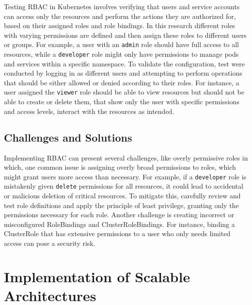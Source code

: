 Testing RBAC in Kubernetes involves verifying that users and service accounts can access only the resources and perform the actions they are authorized for, based on their assigned roles and role bindings. In this research different roles with varying permissions are defined and then assign these roles to different users or groups. For example, a user with an \texttt{admin} role should have full access to all resources, while a \texttt{developer} role might only have permissions to manage pods and services within a specific namespace. To validate the configuration, test were conducted by logging in as different users and attempting to perform operations that should be either allowed or denied according to their roles. For instance, a user assigned the \texttt{viewer} role should be able to view resources but should not be able to create or delete them, that show only the user with specific permissions and access levels, interact with the resources as intended. \cite{Kubernetes_doc}


\subsection{Challenges and Solutions}

Implementing RBAC can present several challenges, like overly permissive roles in which, one common issue is assigning overly broad permissions to roles, which might grant users more access than necessary. For example, if a \texttt{developer} role is mistakenly given \texttt{delete} permissions for all resources, it could lead to accidental or malicious deletion of critical resources. To mitigate this, carefully review and test role definitions and apply the principle of least privilege, granting only the permissions necessary for each role. Another challenge is creating incorrect or misconfigured RoleBindings and ClusterRoleBindings. For instance, binding a ClusterRole that has extensive permissions to a user who only needs limited access can pose a security risk. \cite{Kubernetes_doc}

\section{Implementation of Scalable Architectures}

